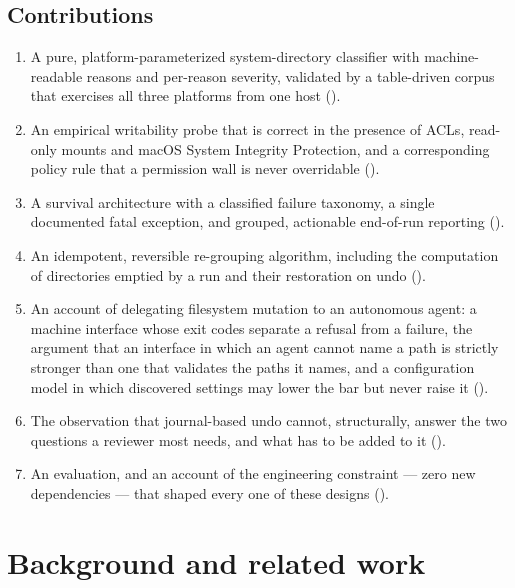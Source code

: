 \documentclass[11pt,a4paper]{article}
\begin{document}
\subsection{Contributions}

\begin{enumerate}[leftmargin=1.6em,itemsep=0.25em]
  \item A pure, platform-parameterized system-directory classifier with
    machine-readable reasons and per-reason severity, validated by a table-driven
    corpus that exercises all three platforms from one host ().
  \item An empirical writability probe that is correct in the presence of ACLs,
    read-only mounts and macOS System Integrity Protection, and a corresponding
    policy rule that a permission wall is never overridable ().
  \item A survival architecture with a classified failure taxonomy, a single
    documented fatal exception, and grouped, actionable end-of-run reporting
    ().
  \item An idempotent, reversible re-grouping algorithm, including the computation of
    directories emptied by a run and their restoration on undo ().
  \item An account of delegating filesystem mutation to an autonomous agent: a
    machine interface whose exit codes separate a refusal from a failure, the
    argument that an interface in which an agent cannot name a path is
    strictly stronger than one that validates the paths it names, and a
    configuration model in which discovered settings may lower the bar but
    never raise it ().
  \item The observation that journal-based undo cannot, structurally, answer
    the two questions a reviewer most needs, and what has to be added to it
    ().
  \item An evaluation, and an account of the engineering constraint --- zero new
    dependencies --- that shaped every one of these designs ().
\end{enumerate}

\section{Background and related work}
\label{sec:related}
\end{document}
